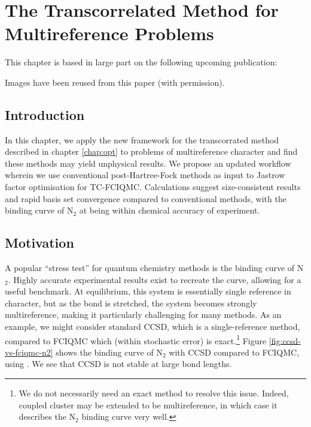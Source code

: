 \chapter{The Transcorrelated Method for Multireference Problems}
\label{chap:binding}

This chapter is based in large part on the following upcoming publication:\\

Images have been reused from this paper (with permission).

\section{Introduction}

In this chapter, we apply the new framework for the transcorrated method described in chapter \ref{chap:opt} to problems of multireference character and find these methods may yield unphysical results. We propose an updated workflow wherein we use conventional post-Hartree-Fock methods as input to Jastrow factor optimisation for TC-FCIQMC. Calculations suggest size-consistent results and rapid basis set convergence compared to conventional methods, with the binding curve of N$_2$ at \avtz being within chemical accuracy of experiment.

\section{Motivation}

A popular ``stress test'' for quantum chemistry methods is the binding curve of N$_2$. Highly accurate experimental results\supercite{leroyAccurate2006} exist to recreate the curve, allowing for a useful benchmark. At equilibrium, this system is essentially single reference in character, but as the bond is stretched, the system becomes strongly multireference, making it particularly challenging for many methods. As an example, we might consider standard \gls{CCSD}, which is a single-reference method, compared to FCIQMC which (within stochastic error) is exact.\footnote{We do not necessarily need an exact method to resolve this issue. Indeed, coupled cluster may be extended to be multireference, in which case it describes the N$_2$ binding curve very well.\supercite{lyakhMultireference2012}} Figure \ref{fig:ccsd-vs-fciqmc-n2} shows the binding curve of N$_2$ with CCSD compared to FCIQMC, using \vdz. We see that CCSD is not stable at large bond lengths.


